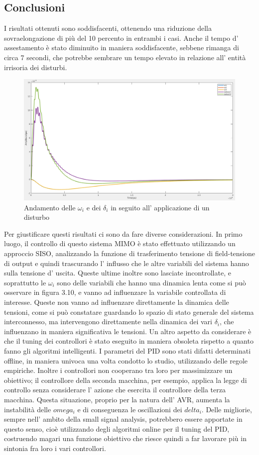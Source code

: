 \documentclass[Lau,noexaminfo]{sapthesis}
\begin{document}
	\subsection{Conclusioni}
	I risultati ottenuti sono soddisfacenti, ottenendo una riduzione della sovraelongazione di più del 10 percento in entrambi i casi. Anche il tempo d' assestamento è stato diminuito in maniera soddisfacente, sebbene rimanga di circa 7 secondi, che potrebbe sembrare un tempo elevato in relazione all' entità irrisoria dei disturbi.
	\begin{figure}[h]
		\centering
		\includegraphics[scale=0.255]{simulazione_oscillazioni_disturbo}
		\caption{Andamento delle $\omega_i$ e dei $\delta_i$ in seguito all' applicazione di un disturbo}
	\end{figure}
	 Per giustificare questi risultati ci sono da fare diverse considerazioni. In primo luogo, il controllo di questo sistema MIMO è stato effettuato utilizzando un approccio SISO, analizzando la funzione di trasferimento tensione di field-tensione di output e quindi trascurando l' influsso che le altre variabili del sistema hanno sulla tensione d' uscita. Queste ultime inoltre sono lasciate incontrollate, e soprattutto le $\omega_i$ sono delle variabili che hanno una dinamica lenta come si può osservare in figura 3.10, e vanno ad influenzare la variabile controllata di interesse. Queste non vanno ad influenzare direttamente la dinamica delle tensioni, come si può constatare guardando lo spazio di stato generale del sistema interconnesso, ma intervengono direttamente nella dinamica dei vari $\delta_i$, che influenzano in maniera significativa le tensioni. Un altro aspetto da considerare è che il tuning dei controllori è stato eseguito in maniera obsoleta rispetto a quanto fanno gli algoritmi intelligenti. I parametri del PID sono stati difatti determinati offline, in maniera univoca una volta condotto lo studio, utilizzando delle regole empiriche. Inoltre i controllori non cooperano tra loro per massimizzare un obiettivo; il controllore della seconda macchina, per esempio, applica la legge di controllo senza considerare l' azione che esercita il controllore della terza macchina. Questa situazione, proprio per la natura dell' AVR, aumenta la instabilità delle $omega_i$ e di conseguenza le oscillazioni dei $delta_i$. Delle migliorie, sempre nell' ambito della small signal analysis, potrebbero essere apportate in questo senso, cioè utilizzando degli algoritmi online per il tuning del PID, costruendo magari una funzione obiettivo che riesce quindi a far lavorare più in sintonia fra loro i vari controllori.
	\appendix
\end{document}
